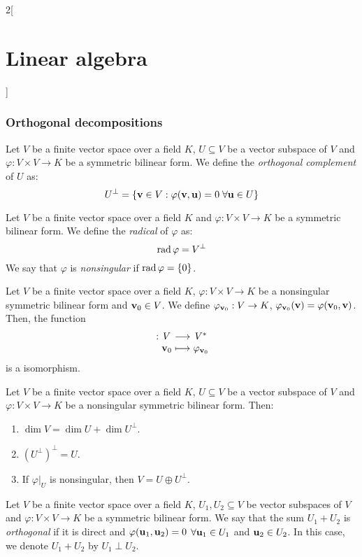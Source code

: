 \documentclass[../../../main.tex]{subfiles}
\begin{document}
\begin{multicols}{2}[\section{Linear algebra}]
  \subsubsection{Orthogonal decompositions}
  \begin{definition}\label{LA_singular}
    Let $V$ be a finite vector space over a field $K$, $U\subseteq V$ be a vector subspace of $V$ and $\varphi:V\times V\rightarrow K$ be a symmetric bilinear form. We define the \emph{orthogonal complement} of $U$ as: $$U^\perp=\{\boldsymbol{\mathrm{v}}\in V:\varphi(\boldsymbol{\mathrm{v}},\boldsymbol{\mathrm{u}})=0\;\forall\boldsymbol{\mathrm{u}}\in U\}$$
  \end{definition}
  \begin{definition}
    Let $V$ be a finite vector space over a field $K$ and $\varphi:V\times V\rightarrow K$ be a symmetric bilinear form. We define the \emph{radical} of $\varphi$ as: $$\operatorname{rad}\varphi=V^\perp$$ We say that $\varphi$ is \emph{nonsingular} if $\operatorname{rad}\varphi=\{0\}$.
  \end{definition}
  \begin{definition}
    Let $V$ be a finite vector space over a field $K$, $\varphi:V\times V\rightarrow K$ be a nonsingular symmetric bilinear form and $\boldsymbol{\mathrm{v}}_0\in V$. We define $\varphi_{\boldsymbol{\mathrm{v}}_0}:V\rightarrow K$, $\varphi_{\boldsymbol{\mathrm{v}}_0}(\boldsymbol{\mathrm{v}})=\varphi(\boldsymbol{\mathrm{v}}_0,\boldsymbol{\mathrm{v}})$. Then, the function
    $$\function{}{V}{V^*}{\vf{v}_0}{\varphi_{\vf{v}_0}}$$ is a isomorphism.
  \end{definition}
  \begin{definition}
    Let $V$ be a finite vector space over a field $K$, $U\subseteq V$ be a vector subspace of $V$ and $\varphi:V\times V\rightarrow K$ be a nonsingular symmetric bilinear form. Then:
    \begin{enumerate}
      \item $\dim V=\dim U+\dim U^\perp$.
      \item ${(U^\perp)}^\perp=U$.
      \item If $\varphi|_U$ is nonsingular, then $V=U\oplus U^\perp$.
    \end{enumerate}
  \end{definition}
  \begin{definition}
    Let $V$ be a finite vector space over a field $K$, $U_1,U_2\subseteq V$ be vector subspaces of $V$ and $\varphi:V\times V\rightarrow K$ be a symmetric bilinear form. We say that the sum $U_1+U_2$ is \emph{orthogonal} if it is direct and $\varphi(\boldsymbol{\mathrm{u}}_1,\boldsymbol{\mathrm{u}}_2)=0$ $\forall \boldsymbol{\mathrm{u}}_1\in U_1$ and $\boldsymbol{\mathrm{u}}_2\in U_2$. In this case, we denote $U_1+U_2$ by $U_1\perp U_2$.

\end{definition}
\end{multicols}
\end{document}
